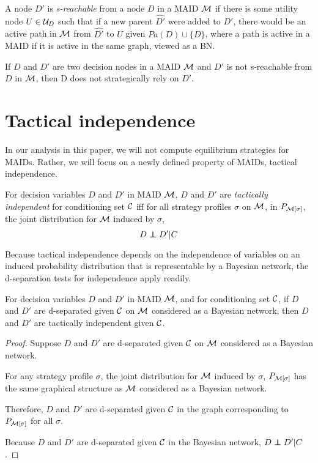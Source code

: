 \documentclass[../thesis.tex]{subfiles}
\begin{document}
\begin{dfn}[s-reachable]
  \label{dfn:s-reachable}
  A node $D'$ is \emph{s-reachable} from a node $D$ in a MAID
  $\mathcal{M}$ if there is some utility node $U \in \mathcal{U}_D$ such
  that if a new parent $\widehat{D'}$ were added to $D'$, there would
  be an active path in $\mathcal{M}$ from $\widehat{D'}$ to $U$ given
  $Pa(D) \cup \{D\}$, where a path is active in a MAID if it
  is active in the same graph, viewed as a BN.
\end{dfn}

\begin{thm}
  \label{thm:strategic-non-reliance}
  If $D$ and $D'$ are two decision nodes in a MAID $\mathcal{M}$
  and $D'$ is not s-reachable from $D$ in $\mathcal{M}$, then D
  does not strategically rely on $D'$.
\end{thm}

\section{Tactical independence}

In our analysis in this paper, we will not compute
equilibrium strategies for MAIDs.
Rather, we will focus on a newly defined property
of MAIDs, tactical independence.

\begin{dfn}
  \label{dfn:tactical-independence}
  For decision variables $D$ and $D'$ in MAID $\mathcal{M}$,
  $D$ and $D'$ are \emph{tactically independent} for
  conditioning set $\mathcal{C}$ iff
  for all strategy profiles $\sigma$ on $\mathcal{M}$,
  in $P_{\mathcal{M}[\sigma]}$, the joint distribution for
  $\mathcal{M}$ induced by $\sigma$,
  $$D \independent D' \vert C$$
\end{dfn}

Because tactical independence depends on the
independence of variables on an induced probability
distribution that is representable by a Bayesian
network, the d-separation tests for independence
apply readily.

\begin{thm}
  For decision variables $D$ and $D'$ in MAID $\mathcal{M}$,
  and for conditioning set $\mathcal{C}$, if
  $D$ and $D'$ are d-separated given $\mathcal{C}$ on
  $\mathcal{M}$ considered as a Bayesian network,
  then $D$ and $D'$ are tactically independent
  given $\mathcal{C}$.
\end{thm}

\begin{proof}
  Suppose $D$ and $D'$ are d-separated given $\mathcal{C}$
  on $\mathcal{M}$ considered as a Bayesian network.

  For any strategy profile $\sigma$,
  the joint distribution for $\mathcal{M}$
  induced by $\sigma$, $P_{\mathcal{M}[\sigma]}$
  has the same graphical structure as $\mathcal{M}$
  considered as a Bayesian network.

  Therefore, $D$ and $D'$ are d-separated given $\mathcal{C}$
  in the graph corresponding to $P_{\mathcal{M}[\sigma]}$
  for all $\sigma$.

  Because $D$ and $D'$ are d-separated given $\mathcal{C}$
  in the Bayesian network, $D \independent D' \vert C$.
\end{proof}
\end{document}
